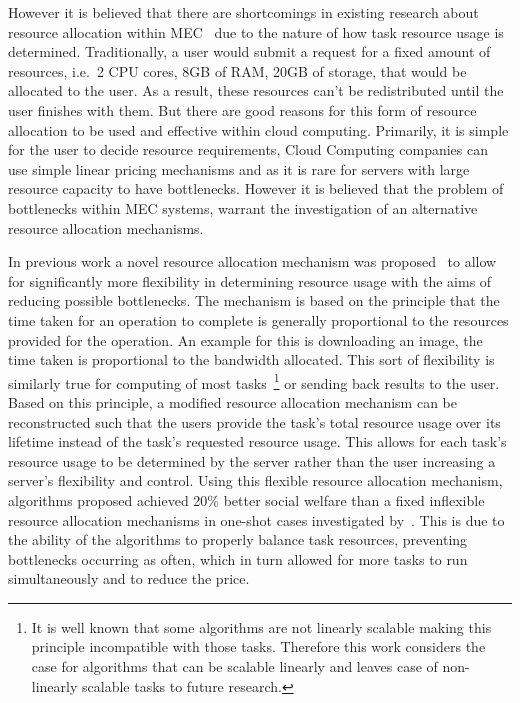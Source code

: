 However it is believed that there are shortcomings in existing research about resource allocation within
MEC~\citep{vaji_infocom, Bi2019} due to the nature of how task resource usage is determined. Traditionally,
a user would submit a request for a fixed amount of resources, i.e.\ 2 CPU cores, 8GB of RAM, 20GB of storage, that
would be allocated to the user. As a result, these resources can't be redistributed until the user finishes with them.
But there are good reasons for this form of resource allocation to be used and effective within cloud computing.
Primarily, it is simple for the user to decide resource requirements, Cloud Computing companies can use simple linear
pricing mechanisms and as it is rare for servers with large resource capacity to have bottlenecks. However it is
believed that the problem of bottlenecks within MEC systems, warrant the investigation of an alternative resource
allocation mechanisms.

In previous work a novel resource allocation mechanism was proposed~\citep{FlexibleResourceAllocation} to allow for
significantly more flexibility in determining resource usage with the aims of reducing possible
bottlenecks. The mechanism is based on the principle that the time taken for an operation to complete is generally
proportional to the resources provided for the operation. An example for this is downloading an image, the time taken
is proportional to the bandwidth allocated. This sort of flexibility is similarly true for computing of most
tasks~\footnote{It is well known that some algorithms are not linearly scalable making this principle incompatible with
those tasks. Therefore this work considers the case for algorithms that can be scalable linearly and leaves case of
non-linearly scalable tasks to future research.} or sending back results to the user. \\
Based on this principle, a modified resource allocation mechanism can be
reconstructed such that the users provide the task's total resource usage over its lifetime instead of the task's
requested resource usage. This allows for each task's resource usage to be determined by the server rather than the user
increasing a server's flexibility and control. Using this flexible resource allocation mechanism, algorithms proposed
achieved 20\% better social welfare than a fixed inflexible resource allocation mechanisms in one-shot cases
investigated by~\cite{FlexibleResourceAllocation}. This is due to the ability of the algorithms to properly balance
task resources, preventing bottlenecks occurring as often, which in turn allowed for more tasks to run simultaneously
and to reduce the price.

